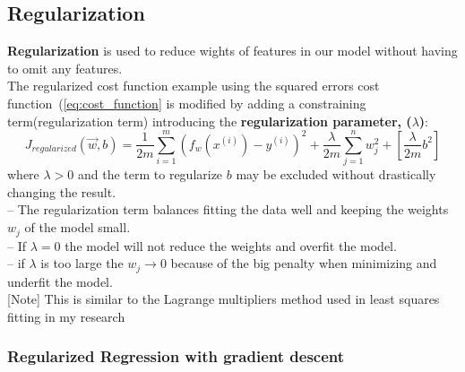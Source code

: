 \documentclass[11pt,letterpaper]{article}
\begin{document}
\subsection{Regularization}
	
\begin{definitionbox}
	\textbf{Regularization} is used to reduce wights of features in our model without having to omit any features. \\ 
	The regularized cost function example using the squared errors cost function~(\cref{eq:cost_function} is modified by adding a constraining term(regularization term) introducing the \textbf{regularization parameter, ($\lambda$)}:
	\begin{equation}\label{eq:regularized_cost_function}
		J_{regularized}(\vec{w},b) = \frac{1}{2m} \sum\limits_{i=1}^m \left( f_w \left( x^{(i)} \right) - y^{(i)} \right)^2 + \frac{\lambda}{2m}\sum\limits_{j=1}^n w_j^2 + \left[  \frac{\lambda}{2m} b^2 \right]
	\end{equation}
	where $\lambda>0$ and the term to regularize $b$ may be excluded without drastically changing the result.\\
	-- The regularization term balances fitting the data well and keeping the weights $w_j$ of the model small. \\ 
	-- If $\lambda=0$ the model will  not reduce the weights and overfit the model. \\
	-- if $\lambda$ is too large the $w_j\rightarrow 0$ because of the big penalty when minimizing and underfit the model. \\ 
	
	[Note] This is similar to the Lagrange multipliers method used in least squares fitting in my research
\end{definitionbox}

\subsubsection{Regularized Regression with gradient descent}
\end{document}
